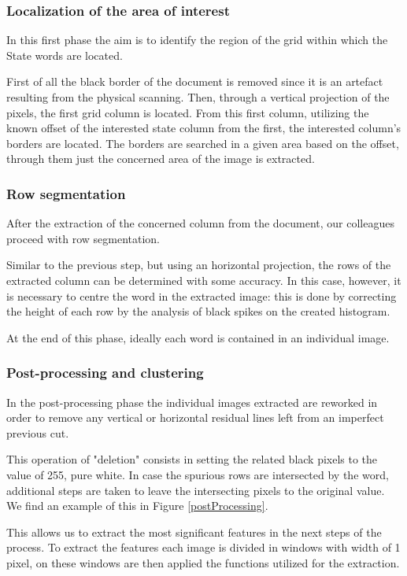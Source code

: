 \subsubsection{Localization of the area of interest}

In this first phase the aim is to identify the region of the grid within which the State words are located. 

First of all the black border of the document is removed since it is an artefact resulting from the physical scanning. Then, through a vertical projection of the pixels, the first grid column is located. From this first column, utilizing the known offset of the interested state column from the first, the interested column's borders are located. The borders are searched in a given area based on the offset, through them just the concerned area of the image is extracted.

\subsubsection{Row segmentation}

After the extraction of the concerned column from the document, our colleagues \cite{vecchioBib} proceed with row segmentation.

Similar to the previous step, but using an horizontal projection, the rows of the extracted column can be determined with some accuracy. In this case, however, it is necessary to centre the word in the extracted image: this is done by correcting the height of each row by the analysis of black spikes on the created histogram.

At the end of this phase, ideally each word is contained in an individual image.

\subsubsection{Post-processing and clustering}
\label{oldFeatures}
In the post-processing phase the individual images extracted are reworked in order to remove any  vertical or horizontal residual lines left from an imperfect previous cut.

This operation of "deletion" consists in setting the related black pixels to the value of 255, pure white.
In case the spurious rows are intersected by the word, additional steps are taken to leave the intersecting pixels to the original value. We find an example of this in Figure \ref{postProcessing}.

This allows us to extract the most significant features in the next steps of the process.
To extract the features each image is divided in windows with width of 1 pixel, on these windows are then applied the functions utilized for the extraction.

